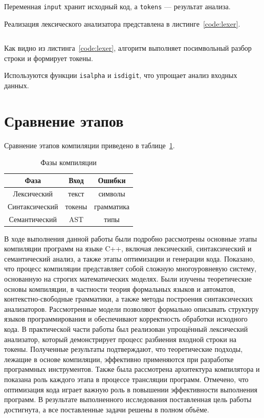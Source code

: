 \documentclass[coursework]{SCWorks}
\begin{document}
Переменная \texttt{input} хранит исходный код, а \texttt{tokens} — результат анализа.

Реализация лексического анализатора представлена в листинге~\ref{code:lexer}.

\inputminted[firstline=1,lastline=80]{cpp}{code_example.cpp}
\label{code:lexer}

Как видно из листинга~\ref{code:lexer}, алгоритм выполняет посимвольный разбор строки и формирует токены.

Используются функции \texttt{isalpha} и \texttt{isdigit}, 
что упрощает анализ входных данных.

\section{Сравнение этапов}

Сравнение этапов компиляции приведено в таблице~\ref{tab:phases}.

\begin{table}[h]
\centering
\caption{Фазы компиляции}
\label{tab:phases}
\begin{tabular}{|c|c|c|}
\hline
Фаза & Вход & Ошибки \\
\hline
Лексический & текст & символы \\
Синтаксический & токены & грамматика \\
Семантический & AST & типы \\
\hline
\end{tabular}
\end{table}

\conclusion
В ходе выполнения данной работы были подробно рассмотрены основные этапы компиляции программ на языке C++, 
включая лексический, синтаксический и семантический анализ, а также этапы оптимизации и генерации кода. 
Показано, что процесс компиляции представляет собой сложную многоуровневую систему, 
основанную на строгих математических моделях. Были изучены теоретические основы компиляции, в частности теория формальных языков и автоматов, 
контекстно-свободные грамматики, а также методы построения синтаксических анализаторов. 
Рассмотренные модели позволяют формально описывать структуру языков программирования 
и обеспечивают корректность обработки исходного кода. В практической части работы был реализован упрощённый лексический анализатор, 
который демонстрирует процесс разбиения входной строки на токены. Полученные результаты подтверждают, что теоретические подходы, лежащие в основе компиляции, 
эффективно применяются при разработке программных инструментов. Также была рассмотрена архитектура компилятора и показана роль каждого этапа в процессе трансляции программ. 
Отмечено, что оптимизация кода играет важную роль в повышении эффективности выполнения программ. В результате выполненного исследования поставленная цель работы достигнута, 
а все поставленные задачи решены в полном объёме.
\end{document}
